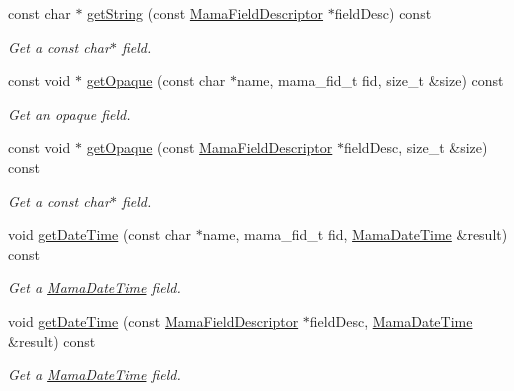 \begin{DoxyCompactItemize}
const char $\ast$ \hyperlink{classWombat_1_1MamaMsg_a7b7ff83c75eb5fbfc3c876375d0d9a8f}{getString} (const \hyperlink{classWombat_1_1MamaFieldDescriptor}{MamaFieldDescriptor} $\ast$fieldDesc) const 
\begin{DoxyCompactList}\small\item\em Get a const char$\ast$ field. \item\end{DoxyCompactList}\item 
const void $\ast$ \hyperlink{classWombat_1_1MamaMsg_a8e72bf4fef44309b5d2e002c111cf188}{getOpaque} (const char $\ast$name, mama\_\-fid\_\-t fid, size\_\-t \&size) const 
\begin{DoxyCompactList}\small\item\em Get an opaque field. \item\end{DoxyCompactList}\item 
const void $\ast$ \hyperlink{classWombat_1_1MamaMsg_a045f33acd83a78a210124836976c9b8a}{getOpaque} (const \hyperlink{classWombat_1_1MamaFieldDescriptor}{MamaFieldDescriptor} $\ast$fieldDesc, size\_\-t \&size) const 
\begin{DoxyCompactList}\small\item\em Get a const char$\ast$ field. \item\end{DoxyCompactList}\item 
void \hyperlink{classWombat_1_1MamaMsg_ae994e5b473cf646ea255b107c13978ec}{getDateTime} (const char $\ast$name, mama\_\-fid\_\-t fid, \hyperlink{classWombat_1_1MamaDateTime}{MamaDateTime} \&result) const 
\begin{DoxyCompactList}\small\item\em Get a \hyperlink{classWombat_1_1MamaDateTime}{MamaDateTime} field. \item\end{DoxyCompactList}\item 
void \hyperlink{classWombat_1_1MamaMsg_ad4b8c8df53573e993d28b50b9628778d}{getDateTime} (const \hyperlink{classWombat_1_1MamaFieldDescriptor}{MamaFieldDescriptor} $\ast$fieldDesc, \hyperlink{classWombat_1_1MamaDateTime}{MamaDateTime} \&result) const 
\begin{DoxyCompactList}\small\item\em Get a \hyperlink{classWombat_1_1MamaDateTime}{MamaDateTime} field. \item\end{DoxyCompactList}\item 

\end{DoxyCompactItemize}
